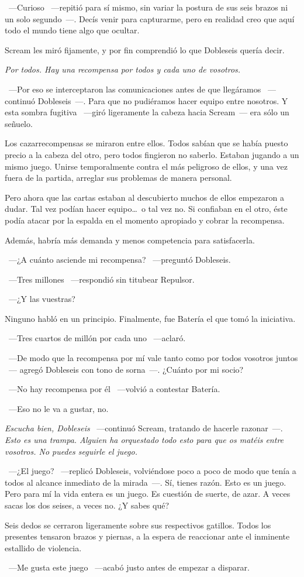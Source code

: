 ~---Curioso ~---repitió para sí mismo, sin variar la postura de sus seis brazos ni un solo segundo~---. Decís venir para capturarme, pero en realidad creo que aquí todo el mundo tiene algo que ocultar.

Scream les miró fijamente, y por fin comprendió lo que Dobleseis quería decir.

\emph{Por todos. Hay una recompensa por todos y cada uno de vosotros.}

~---Por eso se interceptaron las comunicaciones antes de que llegáramos ~---continuó Dobleseis~---. Para que no pudiéramos hacer equipo entre nosotros. Y esta sombra fugitiva ~---giró ligeramente la cabeza hacia Scream~--- era sólo un señuelo.

Los cazarrecompensas se miraron entre ellos. Todos sabían que se había puesto precio a la cabeza del otro, pero todos fingieron no saberlo. Estaban jugando a un mismo juego. Unirse temporalmente contra el más peligroso de ellos, y una vez fuera de la partida, arreglar sus problemas de manera personal.

Pero ahora que las cartas estaban al descubierto muchos de ellos empezaron a dudar. Tal vez podían hacer equipo\dots\ o tal vez no. Si confiaban en el otro, éste podía atacar por la espalda en el momento apropiado y cobrar la recompensa.

Además, habría más demanda y menos competencia para satisfacerla.

~---¿A cuánto asciende mi recompensa? ~---preguntó Dobleseis.

~---Tres millones ~---respondió sin titubear Repulsor.

~---¿Y las vuestras?

Ninguno habló en un principio. Finalmente, fue Batería el que tomó la iniciativa.

~---Tres cuartos de millón por cada uno ~---aclaró.

~---De modo que la recompensa por mí vale tanto como por todos vosotros juntos ~--- agregó Dobleseis con tono de sorna~---. ¿Cuánto por mi socio?

~---No hay recompensa por él ~---volvió a contestar Batería.

~---Eso no le va a gustar, no.

\emph{Escucha bien, Dobleseis} ~---continuó Scream, tratando de hacerle razonar~---. \emph{Esto es una trampa. Alguien ha orquestado todo esto para que os matéis entre vosotros. No puedes seguirle el juego.}

~---¿El juego? ~---replicó Dobleseis, volviéndose poco a poco de modo que tenía a todos al alcance inmediato de la mirada~---. Sí, tienes razón. Esto es un juego. Pero para mí la vida entera es un juego. Es cuestión de suerte, de azar. A veces sacas los dos seises, a veces no. ¿Y sabes qué?

Seis dedos se cerraron ligeramente sobre sus respectivos gatillos. Todos los presentes tensaron brazos y piernas, a la espera de reaccionar ante el inminente estallido de violencia.

~---Me gusta este juego ~---acabó justo antes de empezar a disparar.

\endinput
